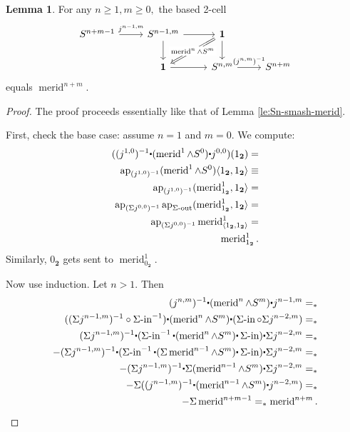 \documentclass{amsart}
\theoremstyle{definition}
\newtheorem{lem}[theorem]{Lemma}
\newcommand{\ap}{\operatorname{ap}}
\newcommand{\merid}{\operatorname{merid}}
\newcommand{\siin}{\operatorname{\Sigma-in}}
\newcommand{\sout}{\operatorname{\Sigma-out}}
\newcommand{\sgtn}{\mathbf{1}}
\newcommand{\s}{\mathbf{2}}
\newcommand{\whisk}{\raisebox{0.5ex}{$\displaystyle\centerdot$}}
\begin{document}
\begin{lem}\label{le:merid-smash-Sm}
    For any $n \geq 1, m \geq 0,$ the based 2-cell
    \[\begin{tikzcd}
    	{S^{n+m-1}} & {S^{n-1,m}} & \sgtn \\
    	& \sgtn & {S^{n,m}} & {S^{n+m}}
    	\arrow["{j^{n-1,m}}", from=1-1, to=1-2]
    	\arrow[from=1-2, to=1-3]
    	\arrow[from=1-2, to=2-2]
    	\arrow["{\merid^n \wedge S^m}"{description}, Rightarrow, from=1-3, to=2-2]
    	\arrow[from=1-3, to=2-3]
    	\arrow[from=2-2, to=2-3]
    	\arrow["{(j^{n,m})^{-1}}", from=2-3, to=2-4]
    \end{tikzcd}\]
    equals $\merid^{n+m}$.
\end{lem}
\begin{proof}
    The proof proceeds essentially like that of Lemma \ref{le:Sn-smash-merid}.

    First, check the base case: assume $n = 1$ and $m=0$. We compute:
    \begin{align*}
    (({j^{1,0}})^{-1} \whisk (\merid^1 \wedge S^0) \whisk j^{0,0}) (1_{\s}) = \\
    \ap_{({j^{1,0}})^{-1}} (\merid^1 \wedge S^0)\langle 1_{\s}, 1_{\s} \rangle \equiv \\
    \ap_{({j^{1,0}})^{-1}} (\merid^1_{1_{\s}}, 1_{\s} \rangle = \\
    \ap_{(\Sigma {j^{0,0}})^{-1}} \ap_{\sout} (\merid^1_{1_{\s}}, 1_{\s} \rangle = \\
    \ap_{(\Sigma {j^{0,0}})^{-1}} \merid^1_{\langle 1_{\s}, 1_{\s} \rangle}
    = \\
    \merid^1_{1_{\s}}.
    \end{align*}
    Similarly, $0_{\s}$ gets sent to $\merid^1_{0_{\s}}$.

    Now use induction. Let $n>1$. Then
    \begin{align*}
    ({j^{n,m}})^{-1} \whisk (\merid^n \wedge S^m) \whisk j^{n-1, m} =_* \\
    ((\Sigma {j^{n-1,m}})^{-1} \circ \siin^{-1}) \whisk (\merid^n \wedge S^m) \whisk (\siin \circ \Sigma j^{n-2,m}) =_* \\
    (\Sigma {j^{n-1,m}})^{-1} \whisk (\siin^{-1} \whisk (\merid^n \wedge S^m) \whisk \siin) \whisk \Sigma j^{n-2,m} =_* \\
    - (\Sigma {j^{n-1,m}})^{-1} \whisk (\siin^{-1} \whisk (\Sigma \merid^{n-1} \wedge S^m) \whisk \siin) \whisk \Sigma j^{n-2,m} =_* \\
    - (\Sigma {j^{n-1,m}})^{-1} \whisk  \Sigma (\merid^{n-1} \wedge S^m) \whisk \Sigma j^{n-2,m} =_* \\
    - \Sigma (({j^{n-1,m}})^{-1} \whisk (\merid^{n-1} \wedge S^m) \whisk j^{n-2,m}) =_* \\
    - \Sigma \merid^{n+m-1} =_* \merid^{n+m}.
    \end{align*}


\end{proof}
\end{document}
